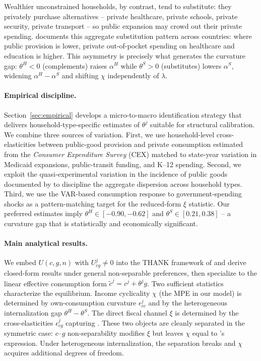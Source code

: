 Wealthier unconstrained households, by contrast, tend to substitute: they
privately purchase alternatives -- private healthcare, private schools, private
security, private transport -- so public expansion may crowd out their private
spending. \citet{Gethin2023} documents this aggregate substitution pattern
across countries: where public provision is lower, private out-of-pocket spending
on healthcare and education is higher. This asymmetry is precisely what
generates the curvature gap: $\theta^{H}<0$ (complements) raises $\alpha^{H}$
while $\theta^{S}>0$ (substitutes) lowers $\alpha^{S}$, widening
$\alpha^{H}-\alpha^{S}$ and shifting $\chi$ independently of $\lambda$.

\paragraph{Empirical discipline.}
Section~\ref{sec:empirical} develops a micro-to-macro identification strategy
that delivers household-type-specific estimates of $\theta^{j}$ suitable for
structural calibration. We combine three sources of variation. First, we use
household-level cross-elasticities between public-good provision and private
consumption estimated from the \textit{Consumer Expenditure Survey} (CEX) matched
to state-year variation in Medicaid expansions, public-transit funding, and
K--12 spending. Second, we exploit the quasi-experimental variation in the
incidence of public goods documented by \citet{Gethin2023} to discipline the
aggregate dispersion across household types. Third, we use the VAR-based
consumption response to government-spending shocks \citep{Ramey2011} as a
pattern-matching target for the reduced-form $\xi$ statistic. Our preferred
estimates imply $\theta^{H}\in[-0.90,-0.62]$ and
$\theta^{S}\in[0.21,0.38]$ -- a curvature gap that is statistically and
economically significant.

\paragraph{Main analytical results.}
We embed $U(c,g,n)$ with $U_{cg}^{j}\neq 0$ into the THANK framework of
\bilbiie{} and derive closed-form results under general non-separable
preferences, then specialize to the linear effective consumption form
$\tilde c^{j}=c^{j}+\theta^{j}g$. Two sufficient statistics characterize the
equilibrium. Income cyclicality $\chi$ (the MPE in our model) is determined by
own-consumption curvature $\epsilon^{j}_{cc}$ and by the heterogeneous
internalization gap $\theta^{H}-\theta^{S}$. The direct fiscal channel $\xi$ is
determined by the cross-elasticities $\epsilon^{j}_{cg}$ capturing \EC{}. These
two objects are cleanly separated in the symmetric case: $c$--$g$
non-separability modifies $\xi$ but leaves $\chi$ equal to \bilbiie{}'s
expression. Under heterogeneous internalization, the separation breaks and
$\chi$ acquires additional degrees of freedom.

